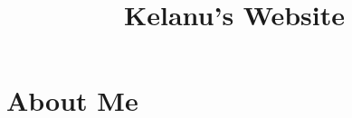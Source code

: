 \documentclass{article}
\title{Kelanu's Website}
\begin{document}
\maketitle
\section{About Me}
\end{document}
